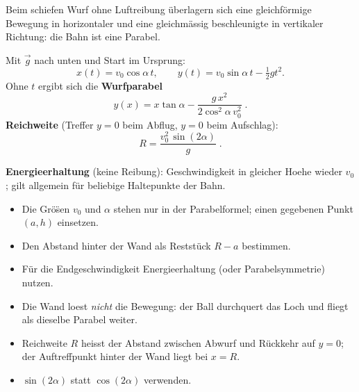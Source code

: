 

Beim schiefen Wurf ohne Luftreibung überlagern sich eine gleichförmige
Bewegung in horizontaler und eine gleichmässig beschleunigte in
vertikaler Richtung: die Bahn ist eine Parabel.

\begin{werkzeugkasten}[Werkzeuge]
Mit $\vec g$ nach unten und Start im Ursprung:
\begin{equation}
  x(t)=v_0\cos\alpha\,t,\qquad
  y(t)=v_0\sin\alpha\,t-\tfrac12 g t^2.
\end{equation}
Ohne $t$ ergibt sich die \textbf{Wurfparabel}
\begin{equation}
  y(x)=x\tan\alpha-\frac{g\,x^2}{2\cos^2\alpha\,v_0^2}\;.
\end{equation}
\textbf{Reichweite} (Treffer $y=0$ beim Abflug, $y=0$ beim Aufschlag):
\begin{equation}
  R=\frac{v_0^2\,\sin(2\alpha)}{g}\;.
\end{equation}

\textbf{Energieerhaltung} (keine Reibung): Geschwindigkeit in gleicher
Hoehe wieder $v_0$; gilt allgemein für beliebige Haltepunkte der Bahn.
\end{werkzeugkasten}

\begin{werkzeugkasten}[Vorgehen]
\begin{itemize}
  \item Die Gr\"o\"sen $v_0$ und $\alpha$ stehen nur in der Parabelformel;
        einen gegebenen Punkt $(a,h)$ einsetzen.
  \item Den Abstand hinter der Wand als Reststück $R-a$ bestimmen.
  \item Für die Endgeschwindigkeit Energieerhaltung (oder Parabelsymmetrie)
        nutzen.
\end{itemize}
\end{werkzeugkasten}

\begin{achtung}
\begin{itemize}
  \item Die Wand loest \emph{nicht} die Bewegung: der Ball durchquert das
        Loch und fliegt als dieselbe Parabel weiter.
  \item Reichweite $R$ heisst der Abstand zwischen Abwurf und R\"uckkehr auf
        $y=0$; der Auftreffpunkt hinter der Wand liegt bei $x=R$.
  \item $\sin(2\alpha)$ statt $\cos(2\alpha)$ verwenden.
\end{itemize}
\end{achtung}

